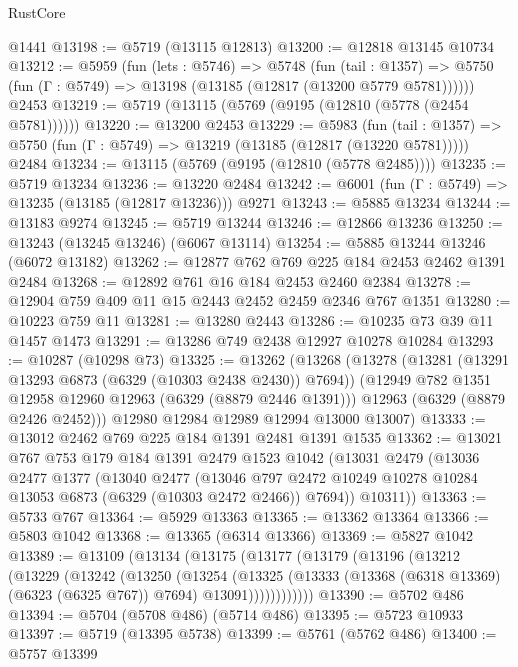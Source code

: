 \begin{lexlean}{RustCore}
\begin{coremodule}
    @1441
@13198 := @5719 (@13115 @12813)
@13200 := @12818 @13145 @10734
@13212 := @5959
    (fun (lets : @5746) =>
    @5748
      (fun (tail : @1357) =>
      @5750 (fun (Γ : @5749) => @13198 (@13185 (@12817 (@13200 @5779 @5781))))))
    @2453
@13219 := @5719 (@13115 (@5769 (@9195 (@12810 (@5778 (@2454 @5781))))))
@13220 := @13200 @2453
@13229 := @5983
    (fun (tail : @1357) => @5750 (fun (Γ : @5749) => @13219 (@13185 (@12817 (@13220 @5781)))))
    @2484
@13234 := @13115 (@5769 (@9195 (@12810 (@5778 @2485))))
@13235 := @5719 @13234
@13236 := @13220 @2484
@13242 := @6001 (fun (Γ : @5749) => @13235 (@13185 (@12817 @13236))) @9271
@13243 := @5885 @13234
@13244 := @13183 @9274
@13245 := @5719 @13244
@13246 := @12866 @13236
@13250 := @13243 (@13245 @13246) (@6067 @13114)
@13254 := @5885 @13244 @13246 (@6072 @13182)
@13262 := @12877 @762 @769 @225 @184 @2453 @2462 @1391 @2484
@13268 := @12892 @761 @16 @184 @2453 @2460 @2384
@13278 := @12904 @759 @409 @11 @15 @2443 @2452 @2459 @2346 @767 @1351
@13280 := @10223 @759 @11
@13281 := @13280 @2443
@13286 := @10235 @73 @39 @11 @1457 @1473
@13291 := @13286 @749 @2438 @12927 @10278 @10284
@13293 := @10287 (@10298 @73)
@13325 := @13262
    (@13268
      (@13278
        (@13281 (@13291 @13293 @6873 (@6329 (@10303 @2438 @2430)) @7694))
        (@12949 @782 @1351 @12958 @12960 @12963 (@6329 (@8879 @2446 @1391)))
        @12963
        (@6329 (@8879 @2426 @2452)))
      @12980
      @12984
      @12989
      @12994
      @13000
      @13007)
@13333 := @13012 @2462 @769 @225 @184 @1391 @2481 @1391 @1535
@13362 := @13021
    @767
    @753
    @179
    @184
    @1391
    @2479
    @1523
    @1042
    (@13031
      @2479
      (@13036
        @2477
        @1377
        (@13040
          @2477
          (@13046 @797 @2472 @10249 @10278 @10284 @13053 @6873 (@6329 (@10303 @2472 @2466)) @7694))
        @10311))
@13363 := @5733 @767
@13364 := @5929 @13363
@13365 := @13362 @13364
@13366 := @5803 @1042
@13368 := @13365 (@6314 @13366)
@13369 := @5827 @1042
@13389 := @13109
    (@13134
      (@13175
        (@13177
          (@13179
            (@13196
              (@13212
                (@13229
                  (@13242
                    (@13250
                      (@13254
                        (@13325
                          (@13333
                            (@13368 (@6318 @13369) (@6323 (@6325 @767)) @7694)
                            @13091))))))))))))
@13390 := @5702 @486
@13394 := @5704 (@5708 @486) (@5714 @486)
@13395 := @5723 @10933
@13397 := @5719 (@13395 @5738)
@13399 := @5761 (@5762 @486)
@13400 := @5757 @13399

\end{coremodule}
\end{lexlean}
